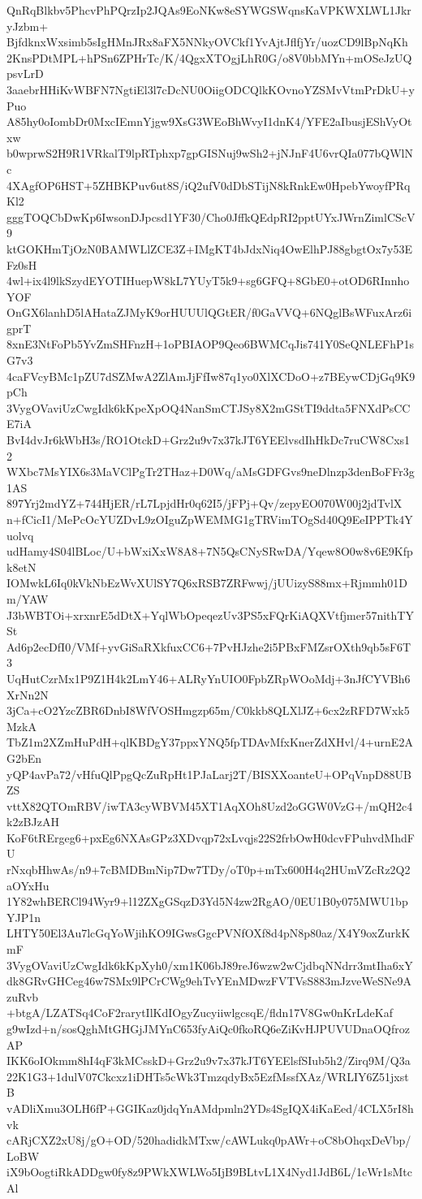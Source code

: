 QnRqBlkbv5PhcvPhPQrzIp2JQAs9EoNKw8eSYWGSWqnsKaVPKWXLWL1JkryJzbm+
BjfdknxWxsimb5sIgHMnJRx8aFX5NNkyOVCkf1YvAjtJflfjYr/uozCD9lBpNqKh
2KnsPDtMPL+hPSn6ZPHrTc/K/4QgxXTOgjLhR0G/o8V0bbMYn+mOSeJzUQpsvLrD
3aaebrHHiKvWBFN7NgtiEl3l7cDcNU0OiigODCQlkKOvnoYZSMvVtmPrDkU+yPuo
A85hy0oIombDr0MxcIEmnYjgw9XsG3WEoBhWvyI1dnK4/YFE2aIbusjEShVyOtxw
b0wprwS2H9R1VRkalT9lpRTphxp7gpGISNuj9wSh2+jNJnF4U6vrQIa077bQWlNc
4XAgfOP6HST+5ZHBKPuv6ut8S/iQ2ufV0dDbSTijN8kRnkEw0HpebYwoyfPRqKl2
gggTOQCbDwKp6IwsonDJpcsd1YF30/Cho0JffkQEdpRI2pptUYxJWrnZimlCScV9
ktGOKHmTjOzN0BAMWLlZCE3Z+IMgKT4bJdxNiq4OwElhPJ88gbgtOx7y53EFz0sH
4wl+ix4l9lkSzydEYOTIHuepW8kL7YUyT5k9+sg6GFQ+8GbE0+otOD6RInnhoYOF
OnGX6lanhD5lAHataZJMyK9orHUUUlQGtER/f0GaVVQ+6NQglBsWFuxArz6igprT
8xnE3NtFoPb5YvZmSHFnzH+1oPBIAOP9Qeo6BWMCqJis741Y0SeQNLEFhP1sG7v3
4caFVcyBMc1pZU7dSZMwA2ZlAmJjFfIw87q1yo0XlXCDoO+z7BEywCDjGq9K9pCh
3VygOVaviUzCwgIdk6kKpeXpOQ4NanSmCTJSy8X2mGStTI9ddta5FNXdPsCCE7iA
BvI4dvJr6kWbH3s/RO1OtckD+Grz2u9v7x37kJT6YEElvsdIhHkDc7ruCW8Cxs12
WXbc7MsYIX6s3MaVClPgTr2THaz+D0Wq/aMsGDFGvs9neDlnzp3denBoFFr3g1AS
897Yrj2mdYZ+744HjER/rL7LpjdHr0q62I5/jFPj+Qv/zepyEO070W00j2jdTvlX
n+fCicI1/MePcOcYUZDvL9zOIguZpWEMMG1gTRVimTOgSd40Q9EeIPPTk4Yuolvq
udHamy4S04lBLoc/U+bWxiXxW8A8+7N5QsCNySRwDA/Yqew8O0w8v6E9Kfpk8etN
IOMwkL6Iq0kVkNbEzWvXUlSY7Q6xRSB7ZRFwwj/jUUizyS88mx+Rjmmh01Dm/YAW
J3bWBTOi+xrxnrE5dDtX+YqlWbOpeqezUv3PS5xFQrKiAQXVtfjmer57nithTYSt
Ad6p2ecDfI0/VMf+yvGiSaRXkfuxCC6+7PvHJzhe2i5PBxFMZsrOXth9qb5sF6T3
UqHutCzrMx1P9Z1H4k2LmY46+ALRyYnUIO0FpbZRpWOoMdj+3nJfCYVBh6XrNn2N
3jCa+cO2YzcZBR6DnbI8WfVOSHmgzp65m/C0kkb8QLXlJZ+6cx2zRFD7Wxk5MzkA
TbZ1m2XZmHuPdH+qlKBDgY37ppxYNQ5fpTDAvMfxKnerZdXHvl/4+urnE2AG2bEn
yQP4avPa72/vHfuQlPpgQcZuRpHt1PJaLarj2T/BISXXoanteU+OPqVnpD88UBZS
vttX82QTOmRBV/iwTA3cyWBVM45XT1AqXOh8Uzd2oGGW0VzG+/mQH2c4k2zBJzAH
KoF6tRErgeg6+pxEg6NXAsGPz3XDvqp72xLvqjs22S2frbOwH0dcvFPuhvdMhdFU
rNxqbHhwAs/n9+7cBMDBmNip7Dw7TDy/oT0p+mTx600H4q2HUmVZcRz2Q2aOYxHu
1Y82whBERCl94Wyr9+l12ZXgGSqzD3Yd5N4zw2RgAO/0EU1B0y075MWU1bpYJP1n
LHTY50El3Au7lcGqYoWjihKO9IGwsGgcPVNfOXf8d4pN8p80az/X4Y9oxZurkKmF
3VygOVaviUzCwgIdk6kKpXyh0/xm1K06bJ89reJ6wzw2wCjdbqNNdrr3mtIha6xY
dk8GRvGHCeg46w7SMx9lPCrCWg9ehTvYEnMDwzFVTVsS883mJzveWeSNe9AzuRvb
+btgA/LZATSq4CoF2rarytIlKdIOgyZucyiiwlgcsqE/fldn17V8Gw0nKrLdeKaf
g9wIzd+n/sosQghMtGHGjJMYnC653fyAiQc0fkoRQ6eZiKvHJPUVUDnaOQfrozAP
IKK6oIOkmm8hI4qF3kMCsskD+Grz2u9v7x37kJT6YEElsfSIub5h2/Zirq9M/Q3a
22K1G3+1dulV07Ckcxz1iDHTs5cWk3TmzqdyBx5EzfMssfXAz/WRLIY6Z51jxstB
vADliXmu3OLH6fP+GGIKaz0jdqYnAMdpmln2YDs4SgIQX4iKaEed/4CLX5rI8hvk
cARjCXZ2xU8j/gO+OD/520hadidkMTxw/cAWLukq0pAWr+oC8bOhqxDeVbp/LoBW
iX9bOogtiRkADDgw0fy8z9PWkXWLWo5IjB9BLtvL1X4Nyd1JdB6L/1cWr1sMtcAl
